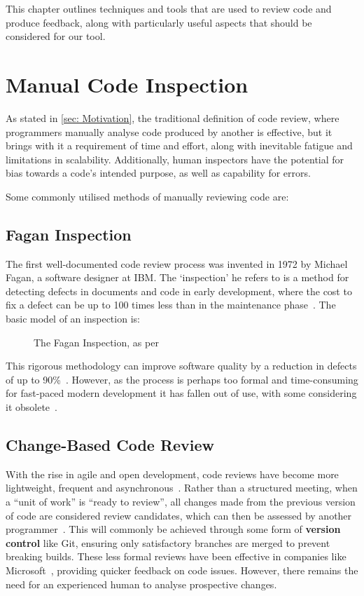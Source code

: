 \label{chapter:relatedwork}

This chapter outlines techniques and tools that are used to review code and produce feedback, along with particularly useful aspects that should be considered for our tool.

\section{Manual Code Inspection}

As stated in \cref{sec: Motivation}, the traditional definition of code review, where programmers manually analyse code produced by another is effective, but it brings with it a requirement of time and effort, along with inevitable fatigue and limitations in scalability. Additionally, human inspectors have the potential for bias towards a code's intended purpose, as well as capability for errors.

Some commonly utilised methods of manually reviewing code are:

\subsection{Fagan Inspection}
The first well-documented code review process was invented in 1972 by Michael Fagan, a software designer at IBM. The `inspection' he refers to is a method for detecting defects in documents and code in early development, where the cost to fix a defect can be up to 100 times less than in the maintenance phase~\cite{FaganInspection}. The basic model of an inspection is:

\begin{figure}[H]
    \centering
    
    \caption{The Fagan Inspection, as per \cite{FaganProcess}}
    \label{fig:fagan}
\end{figure}

This rigorous methodology can improve software quality by a reduction in defects of up to 90\%~\cite{FaganStudy}. However, as the process is perhaps too formal and time-consuming for fast-paced modern development it has fallen out of use, with some considering it obsolete~\cite{FaganStudy}.

\subsection{Change-Based Code Review}
With the rise in agile and open development, code reviews have become more lightweight, frequent and asynchronous~\cite{ChangeBasedCodeReview}. Rather than a structured meeting, when a ``unit of work'' is ``ready to review'', all changes made from the previous version of code are considered review candidates, which can then be assessed by another programmer~\cite{ChangeBasedCodeReview}. This will commonly be achieved through some form of \textbf{version control} like Git, ensuring only satisfactory branches are merged to prevent breaking builds. These less formal reviews have been effective in companies like Microsoft~\cite{MicrosoftCodeReview}, providing quicker feedback on code issues. However, there remains the need for an experienced human to analyse prospective changes.

